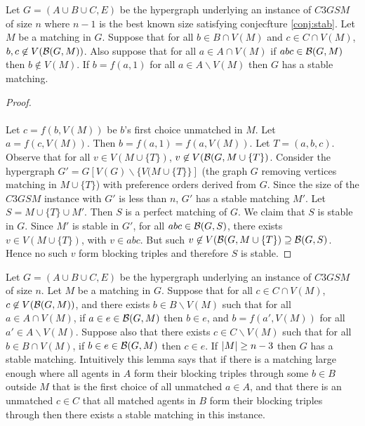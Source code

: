 \begin{lemma} Let $G=(A\cup B \cup C, E)$ be the hypergraph underlying an instance of $C3GSM$ of size $n$ where $n-1$ is the best known size satisfying conjecfture \ref{conj:stab}. Let $M$ be a matching in $G$. Suppose that for all $b\in B\cap V(M)$ and $c\in C\cap V(M)$, $b,c \not\in V(\mathcal{B}(G,M))$. Also suppose that for all $a \in A\cap V(M)$ if $abc \in \mathcal{B}(G,M)$ then $b \not\in V(M)$. If $b = f(a,1)$ for all $a \in A\backslash V(M)$ then $G$ has a stable matching.
\end{lemma}
\begin{proof}
\paragraph{}
Let $c = f(b,V(M))$ be $b$'s first choice unmatched in $M$. Let $a=f(c,V(M))$. Then $b = f(a,1) = f(a,V(M))$. Let $T = (a,b,c)$. Observe that for all $v \in V(M \cup \{T\})$,  $v \not\in V(\mathcal{B}(G,M\cup\{T\})$. Consider the hypergraph $G' = G[V(G)\backslash \{V(M \cup \{T\}\}]$ (the graph $G$ removing vertices matching in $M \cup\{T\}$) with preference orders derived from $G$. Since the size of the $C3GSM$ instance with $G'$ is less than $n$, $G'$ has a stable matching $M'$. Let $S = M \cup \{T\} \cup M'$. Then $S$ is a perfect matching of $G$. We claim that $S$ is stable in $G$. Since $M'$ is stable in $G'$, for all $abc \in \mathcal{B}(G,S)$, there exists $v \in V(M \cup \{T\})$, with $v \in abc$. But such $v \not\in V(\mathcal{B}(G,M\cup\{T\}) \supseteq \mathcal{B}(G,S)$. Hence no such $v$ form blocking triples and therefore $S$ is stable. 
\end{proof}
\begin{lemma}
Let $G=(A\cup B \cup C, E)$ be the hypergraph underlying an instance of $C3GSM$ of size $n$. Let $M$ be a matching in $G$. Suppose that for all $c \in C \cap V(M)$, $c \not\in V(\mathcal{B}(G, M))$, and there exists $b \in B \backslash V(M)$ such that for all $a \in A \cap V(M)$, if $a\in e \in \mathcal{B}(G,M)$ then $b \in e$, and $b = f(a',V(M))$ for all $a'\in A \backslash V(M)$. Suppose also that there exists $c \in C\backslash V(M)$ such that for all $b \in B \cap V(M)$, if $b \in e \in \mathcal{B}(G,M)$ then $c \in e$. If $\left|M\right| \geq n-3$ then $G$ has a stable matching. Intuitively this lemma says that if there is a matching large enough where all agents in $A$ form their blocking triples through some $b \in B$ outside $M$ that is the first choice of all unmatched $a \in A$, and that there is an unmatched $c \in C$ that all matched agents in $B$ form their blocking triples through then there exists a stable matching in this instance.
\end{lemma}
